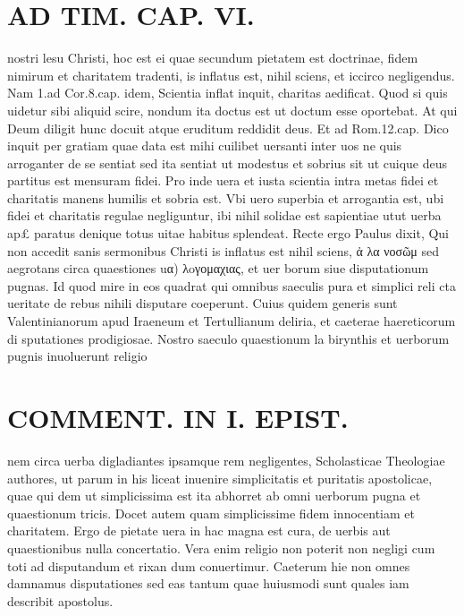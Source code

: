 \documentclass{article}
\begin{document}
\begin{pages}
\section*{AD TIM. CAP. VI. }
\marginpar{[ p.165 ]}\pstart nostri lesu Christi, hoc est ei quae secundum pietatem est doctrinae, fidem nimirum et charitatem tradenti, is inflatus est, nihil sciens, et iccirco negligendus. Nam 1.ad Cor.8.cap. idem, Scientia inflat inquit, charitas aedificat. Quod si quis uidetur sibi aliquid scire, nondum ita doctus est ut doctum esse oportebat. At qui Deum diligit hunc docuit atque eruditum reddidit deus. Et ad Rom.12.cap. Dico inquit per gratiam quae data est mihi cuilibet uersanti inter uos ne quis arroganter de se sentiat sed ita sentiat ut modestus et sobrius sit ut cuique deus partitus est mensuram fidei. Pro inde uera et iusta scientia intra metas fidei et charitatis manens humilis et sobria est. Vbi uero superbia et arrogantia est, ubi fidei et charitatis regulae negliguntur, ibi nihil solidae est sapientiae utut uerba ap£ paratus denique totus uitae habitus splendeat. Recte ergo Paulus dixit, Qui non accedit sanis sermonibus Christi is inflatus est nihil sciens, ἀ λα νοσῶμ sed aegrotans circa quaestiones uα) λoγομαχιας, et uer borum siue disputationum pugnas. Id quod mire in eos quadrat qui omnibus saeculis pura et simplici reli cta ueritate de rebus nihili disputare coeperunt. Cuius quidem generis sunt Valentinianorum apud Iraeneum et Tertullianum deliria, et caeterae haereticorum di sputationes prodigiosae. Nostro saeculo quaestionum la birynthis et uerborum pugnis inuoluerunt religio\pend
\section*{COMMENT. IN I. EPIST. }\pstart nem circa uerba digladiantes ipsamque rem negligentes, Scholasticae Theologiae authores, ut parum in his liceat inuenire simplicitatis et puritatis apostolicae, quae qui dem ut simplicissima est ita abhorret ab omni uerborum pugna et quaestionum tricis. Docet autem quam simplicissime fidem innocentiam et charitatem. Ergo de pietate uera in hac magna est cura, de uerbis aut quaestionibus nulla concertatio. Vera enim religio non poterit non negligi cum toti ad disputandum et rixan dum conuertimur. Caeterum hie non omnes damnamus disputationes sed eas tantum quae huiusmodi sunt quales iam describit apostolus.  \pend
{}
{}

\end{pages}
\end{document}
